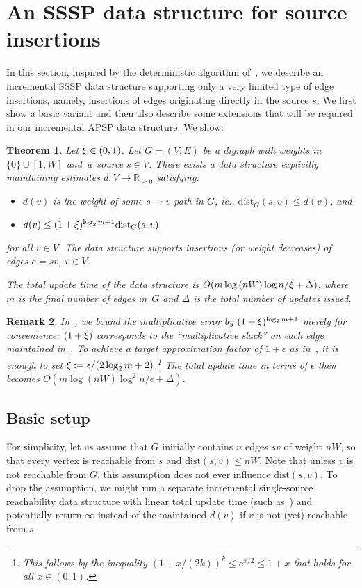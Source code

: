 \documentclass[11pt,letterpaper]{article}
\theoremstyle{plain}
\newtheorem{theorem}{Theorem}[section]
\newtheorem{remark}[theorem]{Remark}
\newcommand{\eps}{\ensuremath{\epsilon}}
\newcommand{\dist}{\mathrm{dist}}
\begin{document}
\section{An SSSP data structure for source insertions}\label{sec:source-insertions}
In this section, inspired by the deterministic algorithm of~\cite{KyngMG22}, we describe an incremental SSSP data structure supporting only a very limited type of edge insertions, namely, insertions of edges originating directly in the source $s$.
We first show a basic variant and then also describe some extensions that will be required in our incremental APSP data structure.
We show:
\begin{theorem}\label{t:source-sssp}
Let $\xi\in (0,1)$. Let $G=(V,E)$ be a digraph with weights in ${\{0\}\cup [1,W]}$ and~a~source $s\in V$. There exists a data structure explicitly maintaining estimates $d:V\to\mathbb{R}_{\geq 0}$ satisfying:
\begin{itemize}
  \item $d(v)$ is the weight of some $s\to v$ path in $G$, ie., $\dist_G(s,v)\leq d(v)$, and
  \item $d(v) \leq (1+\epsp)^{\log_2{m}+1}\dist_G(s,v)$
\end{itemize}
for all $v\in V$.
The data structure supports insertions (or weight decreases) of edges $e=sv$, $v\in V$.

The total update time of the data structure
is $O(m\log{(nW)}\log{n}/\xi+\Delta)$, where $m$ is the final number of edges in~$G$
and $\Delta$ is the total number of updates issued.
\end{theorem}

\begin{remark}\label{remark: epsp fix}
In~, we bound the multiplicative error by $(1+\xi)^{\log_2{m}+1}$ merely for
convenience: $(1+\xi)$ corresponds to the ``multiplicative slack'' on each edge maintained
in~.
  To achieve a target approximation factor of $1+\eps$ as in~, it is enough to set $\epsp:=\eps/(2\log_2{m}+2)$.\footnote{
  This follows by the inequality $(1+x/(2k))^k\leq e^{x/2}\leq 1+x$ that holds for all $x\in (0,1)$.}
The total update time in terms of $\eps$ then becomes $O(m\log(nW)\log^2{n}/\eps+\Delta)$.
\end{remark}

\subsection{Basic setup}\label{sec:setup}
For simplicity, let us assume that $G$ initially contains $n$ edges $sv$ of weight $nW$, so that every
vertex is reachable from $s$ and $\dist(s,v)\leq nW$. Note that unless $v$ is not reachable from $G$,
this assumption does not ever influence $\dist(s,v)$. To drop the assumption, we might run a separate
incremental single-source reachability data structure with linear total update time (such as~\cite{Italiano86})
and potentially return $\infty$ instead of the maintained $d(v)$ if $v$ is not (yet) reachable from $s$.
\end{document}
